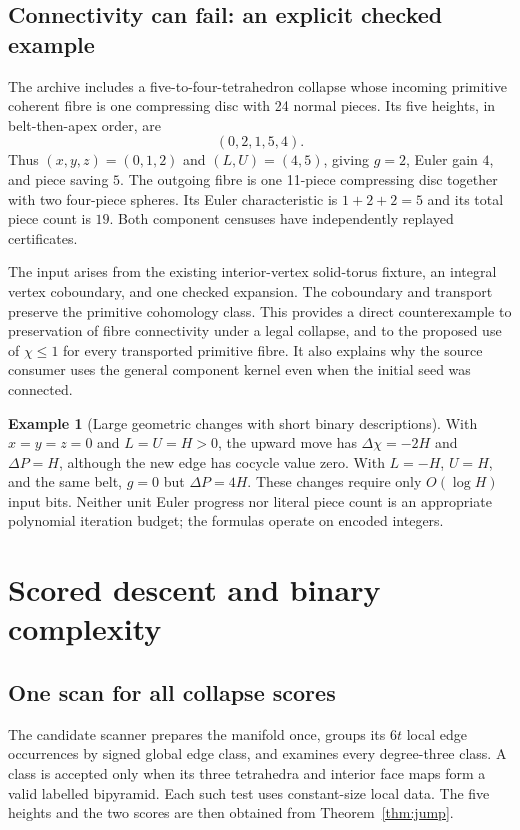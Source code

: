 \documentclass[11pt,letterpaper]{article}
\theoremstyle{definition}
\newtheorem{example}[theorem]{Example}
\theoremstyle{remark}
\begin{document}
\subsection{Connectivity can fail: an explicit checked example}
\label{sec:splitting}

The archive includes a five-to-four-tetrahedron collapse whose incoming
primitive coherent fibre is one compressing disc with 24 normal pieces.
Its five heights, in belt-then-apex order, are
\[
 (0,2,1,5,4).
\]
Thus $(x,y,z)=(0,1,2)$ and $(L,U)=(4,5)$, giving $g=2$,
Euler gain $4$, and piece saving $5$. The outgoing fibre is one
11-piece compressing disc together with two four-piece spheres. Its
Euler characteristic is $1+2+2=5$ and its total piece count is $19$.
Both component censuses have independently replayed certificates.

The input arises from the existing interior-vertex solid-torus fixture,
an integral vertex coboundary, and one checked expansion. The coboundary
and transport preserve the primitive cohomology class. This provides a
direct counterexample to preservation of fibre connectivity under a legal
collapse, and to the proposed use of $\chi\le1$ for every transported
primitive fibre. It also explains why the source consumer uses the
general component kernel even when the initial seed was connected.

\begin{example}[Large geometric changes with short binary descriptions]
With $x=y=z=0$ and $L=U=H>0$, the upward move has
$\Delta\chi=-2H$ and $\Delta P=H$, although the new edge has cocycle
value zero. With $L=-H$, $U=H$, and the same belt, $g=0$ but
$\Delta P=4H$. These changes require only $O(\log H)$ input bits.
Neither unit Euler progress nor literal piece count is an appropriate
polynomial iteration budget; the formulas operate on encoded integers.
\end{example}

\section{Scored descent and binary complexity}
\label{sec:descent}

\subsection{One scan for all collapse scores}

The candidate scanner prepares the manifold once, groups its $6t$ local
edge occurrences by signed global edge class, and examines every degree-three
class. A class is accepted only when its three tetrahedra and interior
face maps form a valid labelled bipyramid. Each such test uses constant-size
local data. The five heights and the two scores are then obtained from
Theorem~\ref{thm:jump}.
\end{document}
